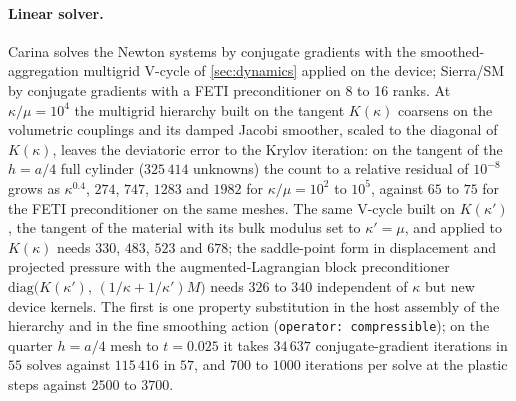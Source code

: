 \documentclass{article}
\newcommand{\code}[1]{\texttt{#1}}
\theoremstyle{definition}
\theoremstyle{plain}
\begin{document}
\paragraph{Linear solver.} Carina solves the Newton systems by conjugate
gradients with the smoothed-aggregation multigrid V-cycle of
\cref{sec:dynamics} applied on the device; Sierra/SM by conjugate gradients
with a FETI preconditioner on 8 to 16 ranks. At $\kappa/\mu = 10^4$ the
multigrid hierarchy built on the tangent $K(\kappa)$ coarsens on the
volumetric couplings and its damped Jacobi smoother, scaled to the diagonal
of $K(\kappa)$, leaves the deviatoric error to the Krylov iteration: on the
tangent of the $h = a/4$ full cylinder ($325\,414$ unknowns) the count to a
relative residual of $10^{-8}$ grows as $\kappa^{0.4}$, $274$, $747$,
$1283$ and $1982$ for $\kappa/\mu = 10^2$ to $10^5$, against $65$ to $75$
for the FETI preconditioner on the same meshes. The same V-cycle built on
$K(\kappa')$, the tangent of the material with its bulk modulus set to
$\kappa' = \mu$, and applied to $K(\kappa)$ needs $330$, $483$, $523$ and
$678$; the saddle-point form in displacement and projected pressure with the
augmented-Lagrangian block preconditioner
$\mathrm{diag}\bigl(K(\kappa'),\, (1/\kappa + 1/\kappa')M\bigr)$ needs
$326$ to $340$ independent of $\kappa$ but new device kernels. The first
is one property substitution in the host assembly of the hierarchy and in
the fine smoothing action (\code{operator: compressible}); on the quarter
$h = a/4$ mesh to $t = 0.025$ it takes $34\,637$ conjugate-gradient
iterations in $55$ solves against $115\,416$ in $57$, and $700$ to $1000$
iterations per solve at the plastic steps against $2500$ to $3700$.
\end{document}
